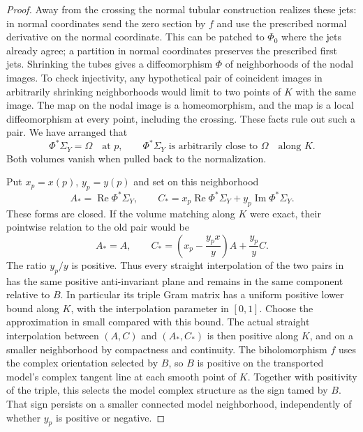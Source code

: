 \begin{proof}
Away from the crossing the normal tubular construction realizes these
jets: in normal coordinates send the zero section by $f$ and use the
prescribed normal derivative on the normal coordinate.  This can be
patched to $\Phi_0$ where the jets already agree; a partition in
normal coordinates preserves the prescribed first jets.  Shrinking
the tubes gives a diffeomorphism $\Phi$ of neighborhoods of the nodal
images.  To check injectivity, any hypothetical pair of coincident
images in arbitrarily shrinking neighborhoods would limit to two
points of $K$ with the same image.  The map on the nodal image is a
homeomorphism, and the map is a local diffeomorphism at every point,
including the crossing.  These facts rule out such a pair.
We have arranged that
\begin{equation}\label{eq:pencil-volume-matching}
 \Phi^*\Sigma_Y=\Omega\quad\text{at }p,
 \qquad
 \Phi^*\Sigma_Y\text{ is arbitrarily close to }\Omega
 \quad\text{along }K.
\end{equation}
Both volumes vanish when pulled back to the normalization.

Put $x_p=x(p)$, $y_p=y(p)$ and set on this neighborhood
\[
 A_*=\operatorname{Re}\Phi^*\Sigma_Y,\qquad
 C_*=x_p\operatorname{Re}\Phi^*\Sigma_Y
       +y_p\operatorname{Im}\Phi^*\Sigma_Y.
\]
These forms are closed.  If the volume matching along $K$ were exact,
their pointwise relation to the old pair would be
\begin{equation}\label{eq:pencil-triangular-matching}
 A_*=A,\qquad
 C_*=\left(x_p-\frac{y_px}{y}\right)A+\frac{y_p}{y}C.
\end{equation}
The ratio $y_p/y$ is positive.  Thus every straight interpolation of
the two pairs in  has the same
positive anti-invariant plane and remains in the same component
relative to $B$.  In particular its triple Gram matrix has a uniform
positive lower bound along $K$, with the interpolation parameter in
$[0,1]$.  Choose the approximation in
 small compared with this bound.
The actual straight interpolation between $(A,C)$ and $(A_*,C_*)$
is then positive along $K$, and on a smaller neighborhood by
compactness and continuity.
The biholomorphism $f$ uses the complex orientation selected by $B$,
so $B$ is positive on the transported model's complex tangent line at
each smooth point of $K$.  Together with positivity of the triple,
this selects the model complex structure as the sign tamed by $B$.
That sign persists on a smaller connected model neighborhood,
independently of whether $y_p$ is positive or negative.


\end{proof}
